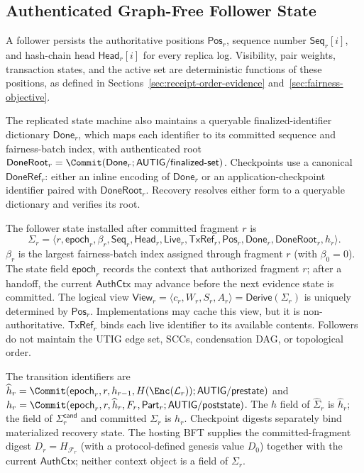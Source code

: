 \subsection{Authenticated Graph-Free Follower State}
\label{sec:authenticated-evidence-state}

A follower persists the authoritative positions $\mathsf{Pos}_r$, sequence
number $\mathsf{Seq}_r[i]$, and hash-chain head $\mathsf{Head}_r[i]$ for every
replica log.  Visibility, pair weights, transaction states, and the active set
are deterministic functions of these positions, as defined in
Sections~\ref{sec:receipt-order-evidence} and~\ref{sec:fairness-objective}.

The replicated state machine also maintains a queryable finalized-identifier
dictionary $\mathsf{Done}_r$, which maps each identifier to its committed sequence
and fairness-batch index, with authenticated root
$\mathsf{DoneRoot}_r=\Commit(\mathsf{Done}_r;
\mathsf{AUTIG/finalized\mbox{-}set})$.  Checkpoints use a canonical
$\mathsf{DoneRef}_r$: either an inline encoding of $\mathsf{Done}_r$ or an
application-checkpoint identifier paired with $\mathsf{DoneRoot}_r$.  Recovery
resolves either form to a queryable dictionary and verifies its root.

The follower state installed after committed fragment $r$ is
\begin{equation}
 \Sigma_r=\langle r,\mathsf{epoch}_r,\beta_r,\mathsf{Seq}_r,
 \mathsf{Head}_r,\mathsf{Live}_r,\mathsf{TxRef}_r,\mathsf{Pos}_r,
 \mathsf{Done}_r,\mathsf{DoneRoot}_r,h_r\rangle.
 \label{eq:follower-state}
\end{equation}
$\beta_r$ is the largest fairness-batch index assigned through fragment $r$
(with $\beta_0=0$).  The state field $\mathsf{epoch}_r$ records the context that
authorized fragment $r$; after a handoff, the current $\mathsf{AuthCtx}$ may
advance before the next evidence state is committed.  The logical view
$\mathsf{View}_r=\langle c_r,W_r,S_r,A_r\rangle
=\mathsf{Derive}(\Sigma_r)$ is uniquely determined by $\mathsf{Pos}_r$.
Implementations may cache this view, but it is non-authoritative.
$\mathsf{TxRef}_r$ binds each live identifier to its available contents.
Followers do not maintain the UTIG edge set, SCCs, condensation DAG, or
topological order.

The transition identifiers are
$\widehat h_r=\Commit(\mathsf{epoch}_r,r,h_{r-1},H(\Enc(\mathcal L_r));
\mathsf{AUTIG/prestate})$ and
$h_r=\Commit(\mathsf{epoch}_r,r,\widehat h_r,F_r,\mathsf{Part}_r;
\mathsf{AUTIG/poststate})$.  The $h$ field of $\widehat\Sigma_r$ is
$\widehat h_r$; the field of $\Sigma_r^{\mathsf{cand}}$ and committed
$\Sigma_r$ is $h_r$.  Checkpoint digests separately bind materialized recovery
state.  The hosting BFT supplies the committed-fragment digest
$D_r=H_{\mathcal F_r}$ (with a protocol-defined genesis value $D_0$) together
with the current $\mathsf{AuthCtx}$; neither context object is a field of
$\Sigma_r$.

